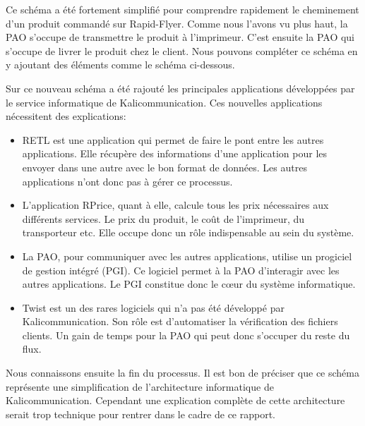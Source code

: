 

Ce schéma a été fortement simplifié pour comprendre rapidement le cheminement d'un produit commandé sur Rapid-Flyer. Comme nous l'avons vu plus haut, la PAO s'occupe de transmettre le produit à l'imprimeur. C'est ensuite la PAO qui s'occupe de livrer le produit chez le client. Nous pouvons compléter ce schéma en y ajoutant des éléments comme le schéma ci-dessous.



Sur ce nouveau schéma a été rajouté les principales applications développées par le service informatique de Kalicommunication. Ces nouvelles applications nécessitent des explications:
\begin{itemize}
\item RETL est une application qui permet de faire le pont entre les autres applications. Elle récupère des informations d'une application pour les envoyer dans une autre avec le bon format de données. Les autres applications n'ont donc pas à gérer ce processus.
\item L'application RPrice, quant à elle, calcule tous les prix nécessaires aux différents services. Le prix du produit, le coût de l'imprimeur, du transporteur etc. Elle occupe donc un rôle indispensable au sein du système.
\item La PAO, pour communiquer avec les autres applications, utilise un progiciel de gestion intégré (PGI). Ce logiciel permet à la PAO d'interagir avec les autres applications. Le PGI constitue donc le cœur du système informatique.
\item Twist est un des rares logiciels qui n'a pas été développé par Kalicommunication. Son rôle est d'automatiser la vérification des fichiers clients. Un gain de temps pour la PAO qui peut donc s'occuper du reste du flux.\newline
\end{itemize}
Nous connaissons ensuite la fin du processus. Il est bon de préciser que ce schéma représente une simplification de l'architecture informatique de Kalicommunication. Cependant une explication complète de cette architecture serait trop technique pour rentrer dans le cadre de ce rapport.